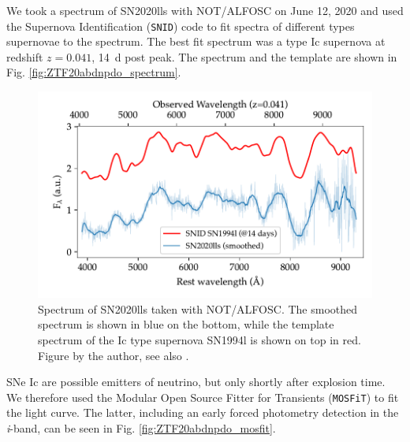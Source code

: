 \documentclass[
    a4paper, %
    fontsize=10pt, %
    twoside=true, %
    numbers=noenddot, %
    fontmethod=tex,
]{kaobook}
\begin{document}
We took a spectrum of SN2020lls with NOT/ALFOSC on June 12, 2020 and used the Supernova Identification (\texttt{SNID}) code  to fit spectra of different types supernovae to the spectrum. The best fit spectrum was a type Ic supernova at redshift $z=0.041$, \SI{14}{\day} post peak. The spectrum and the template are shown in Fig. \ref{fig:ZTF20abdnpdo_spectrum}. 

\begin{figure}[h!]
    \includegraphics[width=1\textwidth]{fu/ZTF20abdnpdo_not_spectrum.pdf}
    \caption[SN2020lls spectrum]{Spectrum of SN2020lls taken with NOT/ALFOSC. The smoothed spectrum is shown in blue on the bottom, while the template spectrum of the Ic type supernova SN1994l is shown on top in red. Figure by the author, see also \cite{Stein2023a}.}
\end{figure}
SNe Ic are possible emitters of neutrino, but only shortly after explosion time. We therefore used the Modular Open Source Fitter for Transients (\texttt{MOSFiT})  to fit the light curve. The latter, including an early forced photometry detection in the \textit{i}-band, can be seen in Fig. \ref{fig:ZTF20abdnpdo_mosfit}.
\end{document}
